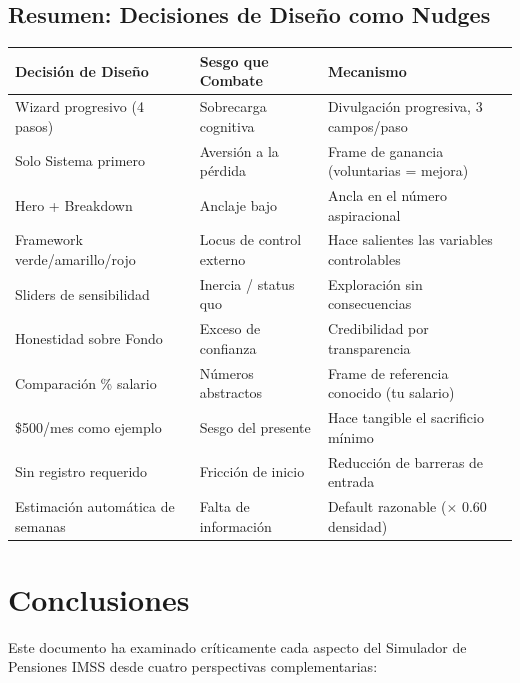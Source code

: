 \documentclass[11pt,a4paper]{report}
\begin{document}
\section{Resumen: Decisiones de Dise\~no como Nudges}

\begin{longtable}{p{3.5cm}p{3.5cm}p{5.5cm}}
\toprule
\textbf{Decisi\'on de Dise\~no} & \textbf{Sesgo que Combate} & \textbf{Mecanismo} \\
\midrule
\endhead
Wizard progresivo (4 pasos) & Sobrecarga cognitiva & Divulgaci\'on progresiva, 3 campos/paso \\
Solo Sistema primero & Aversi\'on a la p\'erdida & Frame de ganancia (voluntarias = mejora) \\
Hero + Breakdown & Anclaje bajo & Ancla en el n\'umero aspiracional \\
Framework verde/amarillo/rojo & Locus de control externo & Hace salientes las variables controlables \\
Sliders de sensibilidad & Inercia / status quo & Exploraci\'on sin consecuencias \\
Honestidad sobre Fondo & Exceso de confianza & Credibilidad por transparencia \\
Comparaci\'on \% salario & N\'umeros abstractos & Frame de referencia conocido (tu salario) \\
\$500/mes como ejemplo & Sesgo del presente & Hace tangible el sacrificio m\'inimo \\
Sin registro requerido & Fricci\'on de inicio & Reducci\'on de barreras de entrada \\
Estimaci\'on autom\'atica de semanas & Falta de informaci\'on & Default razonable ($\times$ 0.60 densidad) \\
\bottomrule
\end{longtable}



\chapter*{Conclusiones}

Este documento ha examinado cr\'iticamente cada aspecto del Simulador de Pensiones IMSS desde cuatro perspectivas complementarias:
\end{document}
